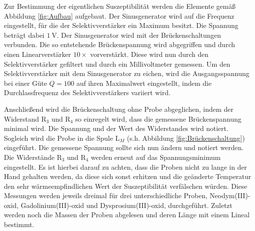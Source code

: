 Zur Bestimmung der eigentlichen Suszeptibilität werden die Elemente gemäß Abbildung \ref{fig:Aufbau} aufgebaut.
Der Sinusgenerator wird auf die Frequenz eingestellt, für die der Selektivverstärker ein Maximum besitzt.
Die Spannung beträgt dabei $\SI{1}{\volt}$.
Der Sinusgenerator wird mit der Brückenschaltungen verbunden.
Die so entstehende Brückenspannung wird abgegriffen und durch einen Linearverstärker $10\times$ vorverstärkt.
Diese wird nun durch den Selektivverstärker gefiltert und durch ein Millivoltmeter gemessen.
Um den Selektivverstärker mit dem Sinusgenerator zu eichen, wird die Ausgangsspannung bei einer Güte $Q = 100$ auf ihren Maximalwert eingestellt, indem die Durchlassfrequenz des Selektivverstärkers variiert wird.

Anschließend wird die Brückenschaltung ohne Probe abgeglichen, indem der Widerstand R$_3$ und R$_4$ so einregelt wird, dass die gemessene Brückenspannung minimal wird.
Die Spannung und der Wert des Widerstandes wird notiert.
Sogleich wird die Probe in die Spule L$_M$ (s.h. Abbildung \ref{fig:Brückenschaltung}) eingeführt.
Die gemessene Spannung sollte sich nun ändern und notiert werden.
Die Widerstände R$_3$ und R$_4$ werden erneut auf das Spannungsminimum eingestellt.
Es ist hierbei darauf zu achten, dass die Proben nicht zu lange in der Hand gehalten werden, da diese sich sonst erhitzen und die geänderte Temperatur den sehr wärmeempfindlichen Wert der Suszeptibilität verfälschen würden.
Diese Messungen werden jeweils dreimal für drei unterschiedliche Proben, Neodym(III)-oxid, Gadolinium(III)-oxid und Dysprosium(III)-oxid, durchgeführt.
Zuletzt werden noch die Massen der Proben abgelesen und deren Länge mit einem Lineal bestimmt. 
